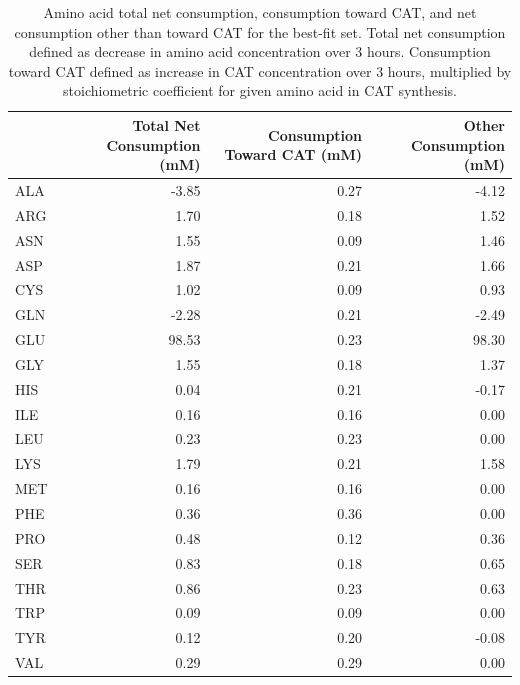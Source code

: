 \documentclass[12pt]{article}
\begin{document}
\begin{table}
\centering
    \caption{Amino acid total net consumption, consumption toward CAT, and net consumption other than toward CAT for the best-fit set. Total net consumption defined as decrease in amino acid concentration over 3 hours. Consumption toward CAT defined as increase in CAT concentration over 3 hours, multiplied by stoichiometric coefficient for given amino acid in CAT synthesis.}
    \renewcommand{\arraystretch}{1.3}
    \begin{tabular}{lrrr} \toprule
        & \parbox{3.6cm}{Total Net \phantom{abcdefgh} Consumption (mM)} & \parbox{3.4cm}{Consumption \phantom{abc} Toward CAT (mM)} & \parbox{3.6cm}{Other \phantom{abcdefgh} Consumption (mM)} \\ \hline
        ALA  & -3.85 & 0.27 & -4.12 \\ \hline
        ARG  & 1.70  & 0.18  & 1.52 \\ \hline
        ASN  & 1.55  & 0.09  & 1.46 \\ \hline
        ASP  & 1.87  & 0.21  & 1.66 \\ \hline
        CYS  & 1.02  & 0.09  & 0.93 \\ \hline
        GLN  & -2.28 & 0.21 & -2.49 \\ \hline
        GLU  & 98.53  & 0.23  & 98.30 \\ \hline
        GLY  & 1.55  & 0.18  & 1.37 \\ \hline
        HIS  & 0.04  & 0.21  & -0.17 \\ \hline
        ILE  & 0.16  & 0.16  & 0.00 \\ \hline
        LEU  & 0.23  & 0.23  & 0.00 \\ \hline
        LYS  & 1.79  & 0.21  & 1.58 \\ \hline
        MET  & 0.16  & 0.16  & 0.00 \\ \hline
        PHE  & 0.36  & 0.36  & 0.00 \\ \hline
        PRO  & 0.48  & 0.12  & 0.36 \\ \hline
        SER  & 0.83  & 0.18  & 0.65 \\ \hline
        THR  & 0.86  & 0.23  & 0.63 \\ \hline
        TRP  & 0.09  & 0.09  & 0.00 \\ \hline
        TYR  & 0.12  & 0.20  & -0.08 \\ \hline
        VAL  & 0.29  & 0.29  & 0.00 \\ \bottomrule
    \end{tabular}
\label{tbl:AA_breakdown}
\end{table}
\end{document}
